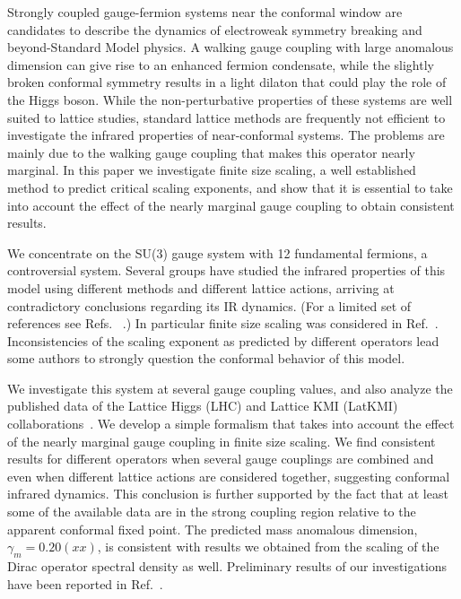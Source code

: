 \documentclass[aps,prl,twocolumn,]{revtex4}  %
\newcommand{\refcite}[1]{Ref.~\cite{#1}}
\begin{document}
Strongly coupled gauge-fermion systems near the conformal window are   candidates to describe the dynamics of electroweak symmetry breaking and beyond-Standard Model physics. A walking  gauge coupling  with large anomalous dimension can give rise to an enhanced fermion condensate,  while the slightly broken conformal symmetry results in a light dilaton that could play the role of the Higgs boson. While the  non-perturbative properties of these systems are well suited to lattice studies,   standard lattice methods are frequently not efficient to investigate the infrared properties of near-conformal systems. The problems are mainly due to  the walking gauge coupling that makes this operator nearly marginal. In this paper we investigate finite size scaling, a well established method to predict critical scaling exponents, and show that it is essential to take into account the effect of the nearly marginal gauge coupling to obtain consistent results. 

We concentrate on the SU(3) gauge system with 12 fundamental fermions,
a controversial system.
Several groups have studied the infrared properties of this model using different methods and different lattice actions, arriving at contradictory conclusions regarding its IR dynamics.
(For a limited set of references see Refs.~\cite{Appelquist:2009ty, Deuzeman:2009mh, Hasenfratz:2011xn, Fodor:2011tu, Appelquist:2011dp,DeGrand:2011cu, Cheng:2011ic, Cheng:2013eu, Fodor:2012uw, Fodor:2012et,  Aoki:2012eq, Aoki:2013pca, Itou:2012qn, Lin:2012iw, Jin:2012dw} .) In particular finite size scaling was considered in \refcite{Fodor:2011tu,Appelquist:2011dp,DeGrand:2011cu,Fodor:2012et,Aoki:2012eq}. Inconsistencies of the scaling exponent as predicted by different operators lead some authors to strongly question the conformal  behavior of this model.

We investigate this system at several gauge coupling values, and  also analyze the published data of the Lattice Higgs (LHC) and Lattice KMI (LatKMI) collaborations~\cite{Fodor:2011tu,Aoki:2012eq}. We develop a simple  formalism that  takes into account the effect of the nearly marginal gauge coupling  in finite size scaling. We find consistent results for different operators  when several gauge couplings are combined and even when different lattice actions are considered together, suggesting conformal infrared dynamics. This conclusion is further supported by the fact that at least some of the available data are in the strong coupling region relative to the apparent conformal fixed point. The predicted mass anomalous dimension, $\gamma_m=0.20(xx)$, is consistent with results we obtained from the scaling of the Dirac operator spectral density as well. Preliminary results of our investigations have been reported in \refcite{Hasenfratz:2013eka}.
\end{document}
